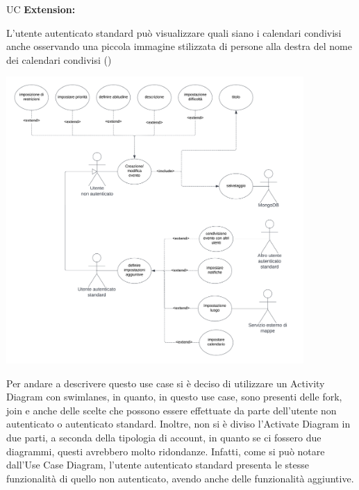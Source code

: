 \begin{listaPersonale}{UC}
    \textbf{Extension:}
    \begin{enumerate}[label=\textbf{[extension \arabic{enumii}]}, ref= \textbf{[extension \arabic{enumii}]}]
         L'utente autenticato standard può visualizzare quali siano i calendari condivisi anche osservando una piccola immagine stilizzata di persone alla destra del nome dei calendari condivisi ()
    \end{enumerate}





    \newpage

    \begin{center}
        \includegraphics[width=0.85\textwidth, height = 0.5\textheight]{img/Diagrammi/UseCases/CreazioneModificaEvento.png}
    \end{center}
    Per andare a descrivere questo use case si è deciso di utilizzare un Activity Diagram con swimlanes, in quanto, in questo use case, sono presenti delle fork, join e anche delle scelte che possono essere effettuate da parte dell'utente non autenticato o autenticato standard. Inoltre, non si è diviso l'Activate Diagram in due parti, a seconda della tipologia di account, in quanto se ci fossero due diagrammi, questi avrebbero molto ridondanze. Infatti, come si può notare dall'Use Case Diagram, l'utente autenticato standard presenta le stesse funzionalità di quello non autenticato, avendo anche delle funzionalità aggiuntive.



\end{listaPersonale}
